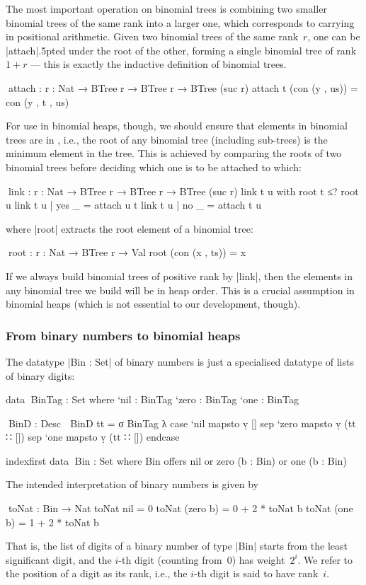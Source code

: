 The most important operation on binomial trees is combining two smaller binomial trees of the same rank into a larger one, which corresponds to carrying in positional arithmetic.
Given two binomial trees of the same rank~$r$, one can be |attach|{\kern.5pt}ed under the root of the other, forming a single binomial tree of rank $1+r$ --- this is exactly the inductive definition of binomial trees.
\begin{code}
^^^attach : {r : Nat} → BTree r → BTree r → BTree (suc r)
attach t (con (y , us)) = con (y , t , us)
\end{code}
For use in binomial heaps, though, we should ensure that elements in binomial trees are in , i.e., the root of any binomial tree (including sub-trees) is the minimum element in the tree.
This is achieved by comparing the roots of two binomial trees before deciding which one is to be attached to which:
\begin{code}
^^^link : {r : Nat} → BTree r → BTree r → BTree (suc r)
link t u with root t ≤? root u
link t u | yes  _ = attach u t
link t u | no   _ = attach t u
\end{code}
where |root| extracts the root element of a binomial tree:
\begin{code}
^^^root : {r : Nat} → BTree r → Val
root (con (x , ts)) = x
\end{code}
If we always build binomial trees of positive rank by |link|, then the elements in any binomial tree we build will be in heap order.
This is a crucial assumption in binomial heaps (which is not essential to our development, though).

\subsubsection{From binary numbers to binomial heaps}
The datatype |Bin : Set| of binary numbers is just a specialised datatype of lists of binary digits:
\begin{code}
data ^^^BinTag : Set where
  `nil   : BinTag
  `zero  : BinTag
  `one   : BinTag

^^^BinD : Desc ⊤
BinD tt = σ BinTag λ  case  `nil   mapsto  ṿ []
                      sep   `zero  mapsto  ṿ (tt ∷ [])
                      sep   `one   mapsto  ṿ (tt ∷ []) endcase

indexfirst data ^^^Bin : Set where
  Bin  offers  nil
       or      zero  (b : Bin)
       or      one   (b : Bin)
\end{code}
The intended interpretation of binary numbers is given by
\begin{code}
^^^toNat : Bin → Nat
toNat nil        = 0
toNat (zero  b)  = 0 + 2 * toNat b
toNat (one   b)  = 1 + 2 * toNat b
\end{code}
That is, the list of digits of a binary number of type |Bin| starts from the least significant digit, and the $i$-th digit (counting from~$0$) has weight~$2^i$.
We refer to the position of a digit as its rank, i.e., the $i$-th digit is said to have rank~$i$.

